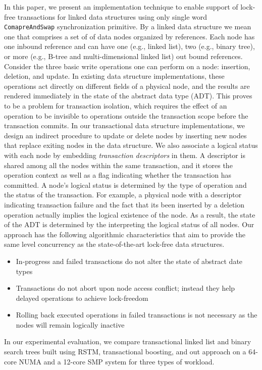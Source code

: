 \documentclass[10pt,conference,compsocconf]{IEEEtran}
\begin{document}
In this paper, we present an implementation technique to enable support of lock-free transactions for linked data structures using only single word \texttt{ComapreAndSwap} synchronization primitive.
By a linked data structure we mean one that comprises a set of of data nodes organized by references. 
Each node has one inbound reference and can have one (e.g., linked list), two (e.g., binary tree), or more (e.g., B-tree and multi-dimensional linked list) out bound references.
Consider the three basic write operations one can perform on a node: insertion, deletion, and update.
In existing data structure implementations, these operations act directly on different fields of a physical node, and the results are rendered immediately in the state of the abstract data type (ADT).
This proves to be a problem for transaction isolation, which requires the effect of an operation to be invisible to operations outside the transaction scope before the transaction commits.
In our transactional data structure implementations, we design an indirect procedure to update or delete nodes by inserting new nodes that replace exiting nodes in the data structure.
We also associate a logical status with each node by embedding \emph{transaction descriptors} in them.
A descriptor is shared among all the nodes within the same transaction, and it stores the operation context as well as a flag indicating whether the transaction has committed.
A node's logical status is determined by the type of operation and the status of the transaction.
For example, a physical node with a descriptor indicating transaction failure and the fact that its been inserted by a deletion operation actually implies the logical existence of the node.
As a result, the state of the ADT is determined by the interpreting the logical status of all nodes.
Our approach has the following algorithmic characteristics that aim to provide the same level concurrency as the state-of-the-art lock-free data structures.
\begin{itemize}
    \item In-progress and failed transactions do not alter the state of abstract date types
    \item Transactions do not abort upon node access conflict; instead they help delayed operations to achieve lock-freedom
    \item Rolling back executed operations in failed transactions is not necessary as the nodes will remain logically inactive
\end{itemize}

In our experimental evaluation, we compare transactional linked list and binary search trees built using RSTM, transactional boosting, and out approach on a 64-core NUMA and a 12-core SMP system for three types of workload. 
\end{document}
